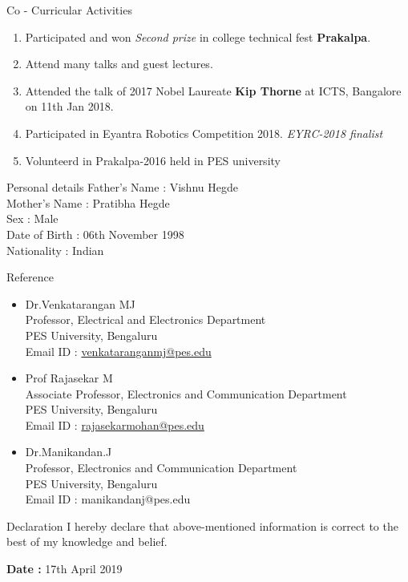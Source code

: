 \documentclass{resume} %
\begin{document}
\vspace{1cm}



\begin{rSection}{Co - Curricular Activities}
\begin{enumerate}
    \item Participated and won \textit{Second prize} in college technical fest {\bf Prakalpa}.
    \item Attend many talks and guest lectures.
    \item Attended the talk of 2017 Nobel Laureate {\bf Kip Thorne} at ICTS, Bangalore on 11th Jan 2018.
    \item Participated in Eyantra Robotics Competition 2018. \textit{EYRC-2018 finalist} 
    \item Volunteerd in Prakalpa-2016 held in PES university
\end{enumerate}
\end{rSection}



\begin{rSection}{Personal details}
Father's Name : Vishnu Hegde \\
Mother's Name : Pratibha Hegde \\
Sex : Male \\
Date of Birth : 06th November 1998 \\
Nationality : Indian \\

\end{rSection}





\begin{rSection}{Reference}
\begin{itemize}

	\item Dr.Venkatarangan MJ\\
		Professor, Electrical and Electronics Department\\
		PES University, Bengaluru\\
		Email ID : \href{http://13.232.26.175/p10106}{venkataranganmj@pes.edu} \\

	\item Prof Rajasekar M\\
		Associate Professor, Electronics and Communication Department\\
		PES University, Bengaluru\\
		Email ID :  \href{https://faculty.pes.edu/p10125}{rajasekarmohan@pes.edu} \\
		
	\item Dr.Manikandan.J\\
		Professor, Electronics and Communication Department\\
		PES University, Bengaluru\\
		Email ID : manikandanj@pes.edu 
\end{itemize}
\end{rSection}


\begin{rSection}{Declaration}
I hereby declare that above-mentioned information is correct to the best of my knowledge and belief. \\
\end{rSection}

{\bf Date : } 17th April 2019
\end{document}
